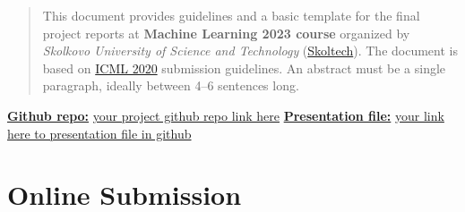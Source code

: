 \documentclass{article}
\begin{document}
\printAffiliationsAndNotice{}  %
\begin{abstract}
  This document provides guidelines and a basic template for the final project reports at \textbf{Machine Learning 2023 course} organized by \textit{Skolkovo University of Science and Technology} (\href{skoltech.ru}{Skoltech}). The document is based on \href{https://icml.cc/Conferences/2020/Dates}{ICML 2020} submission guidelines. An abstract must be a single paragraph, ideally between 4--6 sentences long.
\end{abstract}

\underline{\textbf{Github repo:}} \href{github.com}{your project github repo link here}\newline
\underline{\textbf{Presentation file:}} \href{github.com}{your link here to presentation file in github }

\section{Online Submission}
\label{submission}
\end{document}
